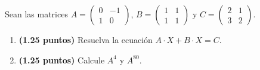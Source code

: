 
Sean las matrices $A=\begin{pmatrix}0&-1\\1&0\end{pmatrix}$, $B=\begin{pmatrix}1&1\\1&1\end{pmatrix}$ y $C=\begin{pmatrix}2&1\\3&2\end{pmatrix}$.
\begin{enumerate}[label=\alph*)]
\item \textbf{(1.25 puntos)} Resuelva la ecuación $A\cdot X+B\cdot X=C$.
\item \textbf{(1.25 puntos)} Calcule $A^4$ y $A^{80}$.
\end{enumerate}
